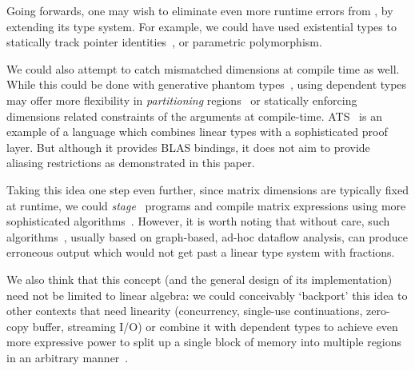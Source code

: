 Going forwards, one may wish to eliminate even more runtime errors from \lang,
by extending its type system. For example, we could have used existential types
to statically track pointer identities~\cite{morrisett}, or parametric
polymorphism.

We could also attempt to catch mismatched dimensions at compile time as well.
While this could be done with generative phantom types~\cite{abe2015simple},
using dependent types may offer more flexibility in \emph{partitioning}
regions~\cite{space_monads} or statically enforcing dimensions related
constraints of the arguments at compile-time.  ATS~\cite{cui2005ats} is an
example of a language which combines linear types with a sophisticated proof
layer. But although it provides BLAS bindings, it does not aim to provide
aliasing restrictions as demonstrated in this paper.

Taking this idea one step even further, since matrix dimensions are typically
fixed at runtime, we could \emph{stage} \lang\ programs and compile matrix
expressions using more sophisticated algorithms~\cite{barthels}. However, it is
worth noting that without care, such algorithms~\cite{rocklin_thesis}, usually
based on graph-based, ad-hoc dataflow analysis, can produce erroneous output
which would not get past a linear type system with fractions.

We also think that this concept (and the general design of its implementation)
need not be limited to linear algebra: we could conceivably `backport' this
idea to other contexts that need linearity (concurrency, single-use
continuations, zero-copy buffer, streaming I/O) or combine it with dependent
types to achieve even more expressive power to split up a single block of
memory into multiple regions in an arbitrary manner~\cite{space_monads}.
